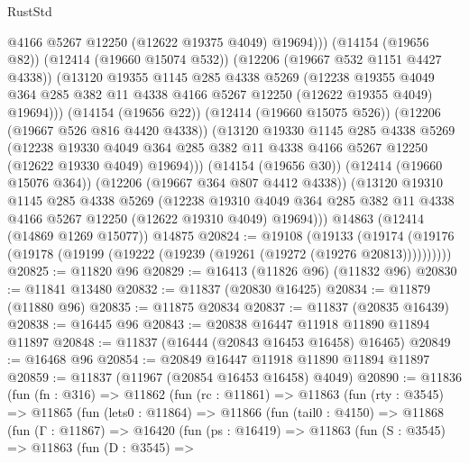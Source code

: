 \begin{lexlean}{RustStd}
\begin{coremodule}
{\begin{coremodule}
{{{{{{{{{{{{{{{{{{{{{{{{{{{{{{{{{{{{{{{{{{{{{{{{{{                @4166
                @5267
                @12250
                (@12622 @19375 @4049)
                @19694)))
          (@14154 (@19656 @82))
          (@12414 (@19660 @15074 @532))
          (@12206 (@19667 @532 @1151 @4427 @4338))
          (@13120
            @19355
            @1145
            @285
            @4338
            @5269
            (@12238
              @19355
              @4049
              @364
              @285
              @382
              @11
              @4338
              @4166
              @5267
              @12250
              (@12622 @19355 @4049)
              @19694)))
        (@14154 (@19656 @22))
        (@12414 (@19660 @15075 @526))
        (@12206 (@19667 @526 @816 @4420 @4338))
        (@13120
          @19330
          @1145
          @285
          @4338
          @5269
          (@12238
            @19330
            @4049
            @364
            @285
            @382
            @11
            @4338
            @4166
            @5267
            @12250
            (@12622 @19330 @4049)
            @19694)))
      (@14154 (@19656 @30))
      (@12414 (@19660 @15076 @364))
      (@12206 (@19667 @364 @807 @4412 @4338))
      (@13120
        @19310
        @1145
        @285
        @4338
        @5269
        (@12238
          @19310
          @4049
          @364
          @285
          @382
          @11
          @4338
          @4166
          @5267
          @12250
          (@12622 @19310 @4049)
          @19694)))
    @14863
    (@12414 (@14869 @1269 @15077))
    @14875
@20824 := @19108
    (@19133 (@19174 (@19176 (@19178 (@19199 (@19222 (@19239 (@19261 (@19272 (@19276 @20813))))))))))
@20825 := @11820 @96
@20829 := @16413 (@11826 @96) (@11832 @96)
@20830 := @11841 @13480
@20832 := @11837 (@20830 @16425)
@20834 := @11879 (@11880 @96)
@20835 := @11875 @20834
@20837 := @11837 (@20835 @16439)
@20838 := @16445 @96
@20843 := @20838 @16447 @11918 @11890 @11894 @11897
@20848 := @11837 (@16444 (@20843 @16453 @16458) @16465)
@20849 := @16468 @96
@20854 := @20849 @16447 @11918 @11890 @11894 @11897
@20859 := @11837 (@11967 (@20854 @16453 @16458) @4049)
@20890 := @11836
    (fun (fn : @316) =>
    @11862
      (fun (rc : @11861) =>
      @11863
        (fun (rty : @3545) =>
        @11865
          (fun (lets0 : @11864) =>
          @11866
            (fun (tail0 : @4150) =>
            @11868
              (fun (Γ : @11867) =>
              @16420
                (fun (ps : @16419) =>
                @11863
                  (fun (S : @3545) =>
                  @11863
                    (fun (D : @3545) =>
}}}}}}}}}}}}}}}}}}}}}}}}}}}}}}}}}}}}}}}}}}}}}}}}}}
\end{coremodule}}
\end{coremodule}
\end{lexlean}
